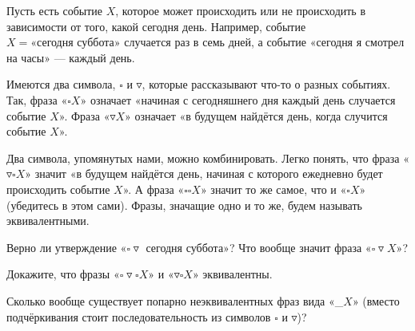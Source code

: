 ﻿
\noindent Пусть есть событие $X$, которое может происходить или не происходить в зависимости от того, какой сегодня день. Например, событие $X = \text{«сегодня суббота»}$ случается раз в семь дней, а событие «сегодня я смотрел на часы» — каждый день. 

\def\sq{\square}
\def\td{\triangledown}
\ms Имеются два символа, $\square$ и $\triangledown$, которые рассказывают что-то о разных событиях. Так, фраза «$\sq X$» означает «начиная с сегодняшнего дня каждый день случается событие $X$». Фраза «$\td X$» означает «в будущем найдётся день, когда случится событие $X$».

\ms Два символа, упомянутых нами, можно комбинировать. Легко понять, что фраза «$\td\sq X$» значит «в будущем найдётся день, начиная с которого ежедневно будет происходить событие $X$». А фраза «$\sq\sq X$» значит то же самое, что и «$\sq X$» (убедитесь в этом сами). Фразы, значащие одно и то же, будем называть эквивалентными.

\begin{enumerate}
\itA Верно ли утверждение «$\sq\td \text{ сегодня суббота}$»? Что вообще значит фраза «$\sq\td X$»?

\itB Докажите, что фразы «$\sq\td\sq X$» и «$\td\sq X$» эквивалентны.

\itC Сколько вообще существует попарно неэквивалентных фраз вида «\_$X$» (вместо подчёркивания стоит последовательность из символов $\sq$ и $\td$)?
\end{enumerate}